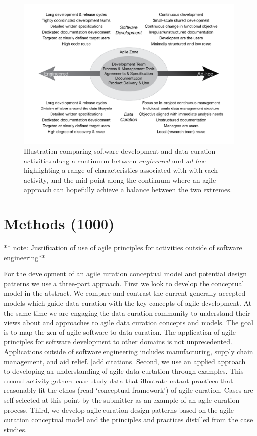 \documentclass[paper]{ijdc-v9}
\begin{document}
\begin{figure}[htbp]
\centering
\includegraphics{agileComparison-01.png}
\caption{Illustration comparing software development and data curation
activities along a continuum between \emph{engineered} and \emph{ad-hoc}
highlighting a range of characteristics associated with with each
activity, and the mid-point along the continuum where an agile approach
can hopefully achieve a balance between the two extremes.}
\end{figure}

\section{Methods (1000)}\label{methods-1000}

** note: Justification of use of agile principles for activities outside
of software engineering**

For the development of an agile curation conceptual model and potential
design patterns we use a three-part approach. First we look to develop
the conceptual model in the abstract. We compare and contrast the
current generally accepted models which guide data curation with the key
concepts of agile development. At the same time we are engaging the data
curation community to understand their views about and approaches to
agile data curation concepts and models. The goal is to map the zen of
agile software to data curation. The application of agile principles for
software development to other domains is not unprecedented. Applications
outside of software engineering includes manufacturing, supply chain
management, and aid relief. {[}add citations{]} Second, we use an
applied approach to developing an understanding of agile data curtation
through examples. This second activity gathers case study data that
illustrate extant practices that reasonably fit the ethos (read
`conceptual framework') of agile curation. Cases are self-selected at
this point by the submitter as an example of an agile curation process.
Third, we develop agile curation design patterns based on the agile
curation conceptual model and the principles and practices distilled
from the case studies.
\end{document}
